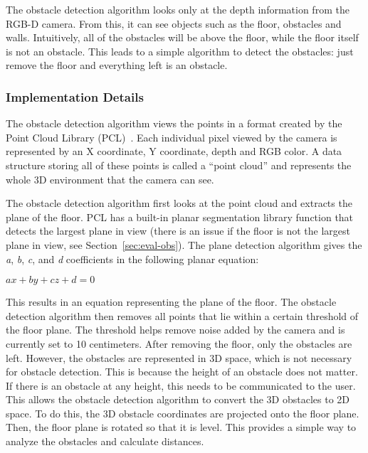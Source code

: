 The obstacle detection algorithm looks only at the depth information from the
RGB-D camera. From this, it can see objects such as the floor, obstacles and
walls. Intuitively, all of the obstacles will be above the floor, while the floor
itself is not an obstacle. This leads to a simple algorithm to detect the
obstacles: just remove the floor and everything left is an obstacle.

\subsubsection{Implementation Details}
\label{sec:technical-obs-impl}

The obstacle detection algorithm views the points in a format created by the
Point Cloud Library (PCL)~\cite{pcl-website}. Each individual pixel viewed by
the camera is represented by an X coordinate, Y coordinate, depth and RGB color.
A data structure storing all of these points is called a ``point cloud'' and
represents the whole 3D environment that the camera can see.

The obstacle detection algorithm first looks at the point cloud and extracts the
plane of the floor. PCL has a built-in planar segmentation library function that
detects the largest plane in view (there is an issue if the floor is not the
largest plane in view, see Section~\ref{sec:eval-obs}).
The plane detection algorithm gives the \emph{a}, \emph{b}, \emph{c}, and
\emph{d} coefficients in the following planar equation:

\begin{math}
ax + by + cz + d = 0
\end{math}

This results in an equation representing the plane of the floor. The obstacle
detection algorithm then removes all points that lie within a certain threshold
of the floor plane. The threshold helps remove noise added by the camera and is
currently set to 10 centimeters. After removing the floor, only the obstacles
are left. However, the obstacles are represented in 3D space, which is not
necessary for obstacle detection. This is because the height of an obstacle does
not matter. If there is an obstacle at any height, this needs to be
communicated to the user. This allows the obstacle detection algorithm to
convert the 3D obstacles to 2D space. To do this, the 3D obstacle coordinates
are projected onto the floor plane. Then, the floor plane is rotated so that it
is level. This provides a simple way to analyze the obstacles and calculate
distances.

